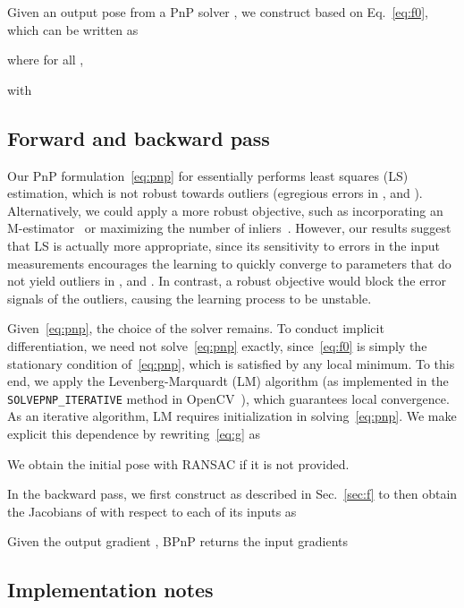 \documentclass[10pt,twocolumn,letterpaper]{article}
\begin{document}
Given an output pose from a PnP solver , we construct  based on Eq.~\eqref{eq:f0}, which can be written as

where for all , 

with 



\subsection{Forward and backward pass}\label{sec:formulation}
Our PnP formulation~\eqref{eq:pnp} for  essentially performs least squares (LS) estimation, which is not robust towards outliers (egregious errors in ,  and ). Alternatively, we could apply a more robust objective, such as incorporating an M-estimator~\cite{Zhang1997parameter} or maximizing the number of inliers~\cite{Fischler1981random}. However, our results suggest that LS is actually more appropriate, since its sensitivity to errors in the input measurements encourages the learning to quickly converge to parameters that do not yield outliers in ,  and . In contrast, a robust objective would block the error signals of the outliers, causing the learning process to be unstable. 

Given~\eqref{eq:pnp}, the choice of the solver remains. To conduct implicit differentiation, we need not solve~\eqref{eq:pnp} exactly, since~\eqref{eq:f0} is simply the stationary condition of~\eqref{eq:pnp}, which is satisfied by any local minimum. To this end, we apply the Levenberg-Marquardt (LM) algorithm (as implemented in the \texttt{SOLVEPNP\_ITERATIVE} method in OpenCV~\cite{Opencv2000}), which guarantees local convergence. As an iterative algorithm, LM requires initialization  in solving~\eqref{eq:pnp}. We make explicit this dependence by rewriting~\eqref{eq:g} as

We obtain the initial pose  with RANSAC if it is not provided.


In the backward pass, we first construct  as described in Sec.~\ref{sec:f} to then obtain the Jacobians of  with respect to each of its inputs as

Given the output gradient , BPnP returns the input gradients 















\subsection{Implementation notes}
\end{document}
